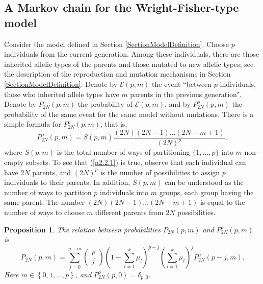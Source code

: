 \documentclass[12pt]{amsart}
\newtheorem{prop}[thm]{Proposition}
\theoremstyle{definition}
\numberwithin{equation}{section}
\begin{document}
\subsection{A Markov chain for the Wright-Fisher-type model}
\label{Section3.1}
Consider the model defined in Section \ref{SectionModelDefinition}.
Choose $p$ individuals from the current generation. Among these individuals,
there are those inherited allelic types of the parents and those mutated to new allelic types; see the description of the reproduction and mutation mechanisms in Section \ref{SectionModelDefinition}. Denote by $\mathcal{E}(p,m)$ the event ``between $p$ individuals, those who inherited allele types have $m$ parents in the previous generation".
Denote by $P_{2N}(p,m)$ the probability of $\mathcal{E}(p,m)$, and by $P_{2N}^{o}(p,m)$
the probability of the same event for the same model without mutations.
There is a simple formula for
$P^{o}_{2N}(p,m)$, that is,
\begin{equation}\label{n2.2.1}
P^{o}_{2N}(p,m)=S(p,m)\frac{(2N)(2N-1)\ldots (2N-m+1)}{(2N)^p},
\end{equation}
where $S(p,m)$  is the total number of ways of partitioning $\{1,\ldots,p\}$ into $m$ non-empty subsets. To see that (\ref{n2.2.1}) is true, observe that each individual can have $2N$ parents, and $(2N)^p$ is the number of possibilities to assign $p$ individuals to their parents.
In addition, $S(p,m)$ can be understood as the number of ways to partition
$p$ individuals into $m$ groups, each group having the same parent. The number $(2N)(2N-1)\ldots (2N-m+1)$ is equal to the number of ways to choose
$m$ different parents from $2N$ possibilities.
\begin{prop}\label{PropositionRelationPPo}The relation between probabilities $P_{2N}(p,m)$ and $P_{2N}^{o}(p,m)$ is
\begin{equation}\label{n2.2}
P_{2N}(p,m)=\sum\limits_{j=0}^{p-m}\left(\begin{array}{c}
  p \\
  j
\end{array}\right)\left(1-\sum\limits_{l=1}^k\mu_l\right)^{p-j}
\left(\sum\limits_{l=1}^k\mu_l\right)^jP_{2N}^{o}(p-j,m).
\end{equation}
Here $m\in\left\{0,1,\ldots,p\right\}$, and $P_{2N}^{o}(p,0)=\delta_{p,0}$.
\end{prop}
\end{document}
